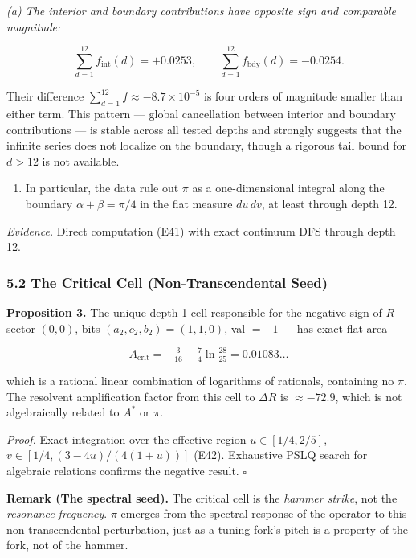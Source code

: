 \documentclass[
  11pt,
]{article}
\providecommand{\tightlist}{%
  \setlength{\itemsep}{0pt}\setlength{\parskip}{0pt}}
\begin{document}
\emph{(a) The interior and boundary contributions have opposite sign and
comparable magnitude:}

\[\sum_{d=1}^{12} f_{\mathrm{int}}(d) = +0.0253, \qquad \sum_{d=1}^{12} f_{\mathrm{bdy}}(d) = -0.0254.\]

Their difference \(\sum_{d=1}^{12} f \approx -8.7 \times 10^{-5}\) is four
orders of magnitude smaller than either term. This pattern --- global
cancellation between interior and boundary contributions --- is stable across
all tested depths and strongly suggests that the infinite series does not
localize on the boundary, though a rigorous tail bound for \(d > 12\) is not
available.

\begin{enumerate}
\def\labelenumi{(\alph{enumi})}
\setcounter{enumi}{1}
\tightlist
\item
  In particular, the data rule out \(\pi\) as a one-dimensional integral along
  the boundary \(\alpha + \beta = \pi/4\) in the flat measure \(du\,dv\), at
  least through depth 12.
\end{enumerate}

\emph{Evidence.} Direct computation (E41) with exact continuum DFS through depth
12.

\subsubsection{5.2 The Critical Cell (Non-Transcendental
Seed)}\label{the-critical-cell-non-transcendental-seed}

\textbf{Proposition 3.} The unique depth-1 cell responsible for the negative
sign of \(R\) --- sector \((0,0)\), bits \((a_2, c_2, b_2) = (1, 1, 0)\), val
\(= -1\) --- has exact flat area

\[A_{\mathrm{crit}} = -\tfrac{3}{16} + \tfrac{7}{4}\ln\tfrac{28}{25} = 0.01083\ldots\]

which is a rational linear combination of logarithms of rationals, containing no
\(\pi\). The resolvent amplification factor from this cell to \(\Delta R\) is
\(\approx -72.9\), which is not algebraically related to \(A^{\ast}\) or
\(\pi\).

\emph{Proof.} Exact integration over the effective region \(u \in [1/4, 2/5]\),
\(v \in [1/4, (3-4u)/(4(1+u))]\) (E42). Exhaustive PSLQ search for algebraic
relations confirms the negative result. \(\square\)

\textbf{Remark (The spectral seed).} The critical cell is the \emph{hammer
strike}, not the \emph{resonance frequency}. \(\pi\) emerges from the spectral
response of the operator to this non-transcendental perturbation, just as a
tuning fork's pitch is a property of the fork, not of the hammer.
\end{document}
